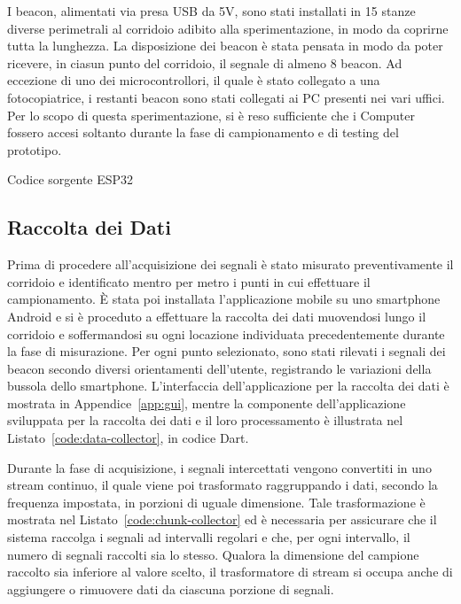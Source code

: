 I beacon, alimentati via presa USB da 5V, sono stati installati in 15 stanze
diverse perimetrali al corridoio adibito alla sperimentazione, in modo da
coprirne tutta la lunghezza. La disposizione dei beacon è stata pensata in modo
da poter ricevere, in ciasun punto del corridoio, il segnale di almeno 8
beacon. Ad eccezione di uno dei microcontrollori, il quale è stato collegato a
una fotocopiatrice, i restanti beacon sono stati collegati ai PC presenti nei
vari uffici. Per lo scopo di questa sperimentazione, si è reso sufficiente che
i Computer fossero accesi soltanto durante la fase di campionamento e di
testing del prototipo.

\begin{listing}[htp]
	\caption{Codice sorgente ESP32}
	\label{code:esp32}
\end{listing}

\subsection{Raccolta dei Dati}
Prima di procedere all'acquisizione dei segnali è stato misurato
preventivamente il corridoio e identificato mentro per metro i punti in cui
effettuare il campionamento. È stata poi installata l'applicazione mobile su
uno smartphone Android e si è proceduto a effettuare la raccolta dei dati
muovendosi lungo il corridoio e soffermandosi su ogni locazione individuata
precedentemente durante la fase di misurazione. Per ogni punto selezionato,
sono stati rilevati i segnali dei beacon secondo diversi orientamenti
dell'utente, registrando le variazioni della bussola dello smartphone.
L'interfaccia dell'applicazione per la raccolta dei dati è mostrata in
Appendice~\ref{app:gui}, mentre la componente dell'applicazione sviluppata per
la raccolta dei dati e il loro processamento è illustrata nel
Listato~\ref{code:data-collector}, in codice Dart.

Durante la fase di acquisizione, i segnali intercettati vengono convertiti in
uno stream continuo, il quale viene poi trasformato raggruppando i dati,
secondo la frequenza impostata, in porzioni di uguale dimensione. Tale
trasformazione è mostrata nel Listato~\ref{code:chunk-collector} ed è
necessaria per assicurare che il sistema raccolga i segnali ad intervalli
regolari e che, per ogni intervallo, il numero di segnali raccolti sia lo
stesso. Qualora la dimensione del campione raccolto sia inferiore al valore
scelto, il trasformatore di stream si occupa anche di aggiungere o rimuovere
dati da ciascuna porzione di segnali.

